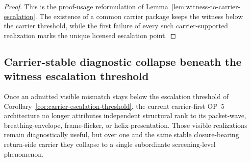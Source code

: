 \begin{proof}
This is the proof-usage reformulation of Lemma~\ref{lem:witness-to-carrier-escalation}. The existence of a common carrier package keeps the witness below the carrier threshold, while the first failure of every such carrier-supported realization marks the unique licensed escalation point.
\end{proof}


\subsection{Carrier-stable diagnostic collapse beneath the witness escalation threshold}
\label{sec:carrier-stable-diagnostic-collapse}

\begin{remark}
Once an admitted visible mismatch stays below the escalation threshold of Corollary~\ref{cor:carrier-escalation-threshold}, the current carrier-first OP~5 architecture no longer attributes independent structural rank to its packet-wave, breathing-envelope, frame-flicker, or helix presentation. Those visible realizations remain diagnostically useful, but over one and the same stable closure-bearing return-side carrier they collapse to a single subordinate screening-level phenomenon.
\end{remark}


